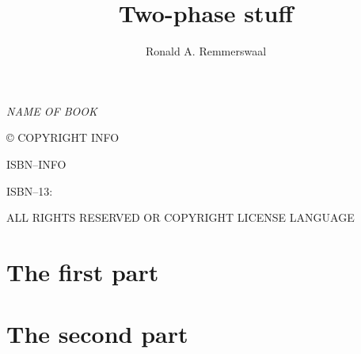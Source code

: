 \documentclass[10pt,twoside,openright]{memoir}
\author{Ronald A. Remmerswaal}
\title{Two-phase stuff}
\date{}
\makeatletter
\def\maketitle{%
  \null
  \thispagestyle{empty}%
  \vfill
  \begin{center}\leavevmode
    \normalfont
    {\LARGE\raggedleft \@author\par}%
    \hrulefill\par
    {\huge\raggedright \@title\par}%
    \vskip 1cm
  \end{center}%
  \vfill
  \null
  \cleardoublepage
  }
\makeatother
\begin{document}
  \let\cleardoublepage\clearpage

  \maketitle

  \frontmatter 
  {
    \tableofcontents
  }

  \null\vfill
 
  \begin{flushleft}
  \textit{NAME OF BOOK}


  © COPYRIGHT INFO


  ISBN--INFO

  ISBN--13:
  \bigskip





  ALL RIGHTS RESERVED OR COPYRIGHT LICENSE LANGUAGE




  \end{flushleft}
  \let\cleardoublepage\clearpage

  \mainmatter
  
  
  \part{The first part}
  
  
  
  \part{The second part}
  

  \backmatter
\end{document}
